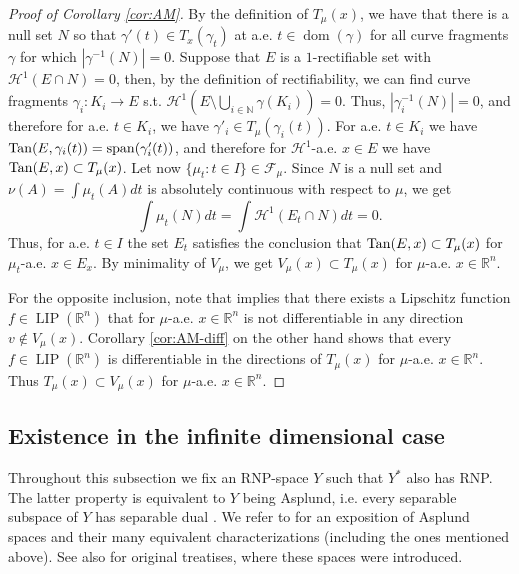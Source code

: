 \documentclass{amsart}
\numberwithin{equation}{section}
\newcommand{\R}{\mathbb{R}}
\newcommand{\N}{\mathbb{N}}
\newcommand{\LIP}{\operatorname{LIP}}
\newcommand{\dom}{\operatorname{dom}}
\begin{document}
\begin{proof}[Proof of Corollary \ref{cor:AM}]
By the definition of $T_\mu(x)$, we have that there is a null set $N$ so that $\gamma'(t)\in T_{x}(\gamma_t)$ at a.e. $t\in \dom (\gamma )$ for all curve fragments $\gamma$ for which $|\gamma^{-1}(N)|=0$. Suppose that $E$ is a $1$-rectifiable set with $\mathcal{H}^1(E\cap N)=0$, then, by the definition of rectifiability, we can find curve fragments $\gamma_i:K_i\to E$ s.t. $\mathcal{H}^1(E \setminus \bigcup_{i\in \N} \gamma(K_i))=0$. Thus, $|\gamma_i^{-1}(N)|=0$, and therefore for a.e. $t\in K_i$, we have $\gamma'_i \in T_\mu(\gamma_i(t))$. For a.e. $t\in K_i$ we have ${\rm Tan}(E, \gamma_i(t))={\rm span}(\gamma'_i(t))$, and therefore for $\mathcal{H}^1$-a.e. $x\in E$ we have ${\rm Tan}(E, x)\subset T_\mu(x)$. Let now $\{\mu_t: t\in I\}\in \mathcal{F}_\mu$.  Since $N$ is a null set and $\nu(A)=\int \mu_t(A) dt$ is absolutely continuous with respect to $\mu$, we get 
\[
\int \mu_t(N) dt = \int \mathcal{H}^1(E_t \cap N) dt = 0.
\]
Thus, for a.e. $t\in I$ the set $E_t$ satisfies the conclusion that ${\rm Tan}(E, x)\subset T_\mu(x)$ for $\mu_t$-a.e. $x\in E_x$. By minimality of $V_\mu$, we get $V_\mu(x)\subset T_\mu(x)$ for $\mu$-a.e. $x\in \R^n$.


For the opposite inclusion, note that \cite[(ii) in Theorem 1.1]{almar16} implies that there exists a Lipschitz function $f\in \LIP(\R^n)$ that for  $\mu$-a.e. $x\in \R^n$ is not differentiable in any direction $v\not\in V_\mu(x)$.  Corollary \ref{cor:AM-diff} on the other hand shows that every $f\in \LIP(\R^n)$ is differentiable in the directions of $T_\mu(x)$ for $\mu$-a.e. $x\in \R^n$. Thus $T_{\mu}(x)\subset  V_\mu(x)$ for $\mu$-a.e. $x\in \R^n$.

\end{proof}

\subsection{Existence in the infinite dimensional case}

Throughout this subsection we fix an RNP-space $Y$ such that $Y^*$ also has RNP. The latter property is equivalent to $Y$ being Asplund, i.e. every separable subspace of $Y$ has separable dual \cite[Theorem 6]{asplund}. We refer to \cite{asplund} for an exposition of Asplund spaces and their many equivalent characterizations (including the ones mentioned above). See also \cite{asplundoriginal,namiokaphelps} for original treatises, where these spaces were introduced.
 
\end{document}
